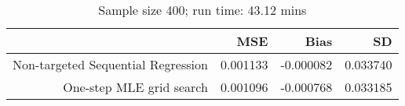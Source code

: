 \begin{table}[ht]
\centering
\caption{Sample size 400; run time: 43.12 mins} 
\begin{tabular}{rrrr}
  \hline
 & MSE & Bias & SD \\ 
  \hline
Non-targeted Sequential Regression & 0.001133 & -0.000082 & 0.033740 \\ 
  One-step MLE grid search & 0.001096 & -0.000768 & 0.033185 \\ 
   \hline
\end{tabular}
\end{table}
